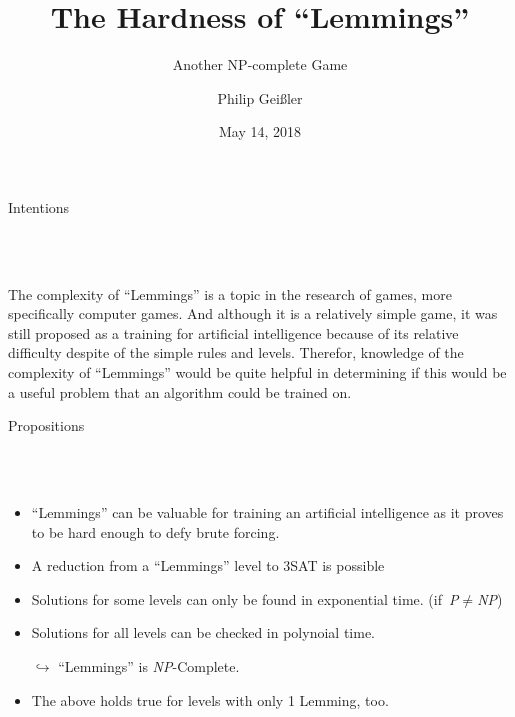 \documentclass[a5paper, 8pt]{scrartcl} %
\begin{document}
\title{The Hardness of ``Lemmings''}
\subtitle{Another NP-complete Game}
\author{Philip Geißler}
\date{May 14, 2018}

\maketitle
\center

\begin{Large}
Intentions
\end{Large}\\\vspace*{-0.25cm}
\hrulefill\\\vspace*{0.3cm}
\begin{minipage}{0.93\textwidth}
The complexity of ``Lemmings'' is a topic in the research of games, more specifically computer games. And although it is a relatively simple game, it was still proposed as a training for artificial intelligence because of its relative difficulty despite of the simple rules and levels. Therefor, knowledge of the complexity of ``Lemmings'' would be quite helpful in determining if this would be a useful problem that an algorithm could be trained on.
\end{minipage}

\vspace*{0.5cm}
\begin{Large}
Propositions
\end{Large}\\\vspace*{-0.25cm}
\hrulefill\\\vspace*{0.3cm}
\begin{minipage}{0.93\textwidth}
\begin{itemize}
\item ``Lemmings'' can be valuable for training an artificial intelligence as it proves to be hard enough to defy brute forcing.
\item A reduction from a ``Lemmings'' level to 3SAT is possible
\item Solutions for some levels can only be found in exponential time. (if~\emph{P}$\neq$\emph{NP})
\item Solutions for all levels can be checked in polynoial time.
\item[$\hookrightarrow$] ``Lemmings'' is \emph{NP}-Complete.
\item The above holds true for levels with only 1 Lemming, too.
\end{itemize}
\end{minipage}
\end{document}
